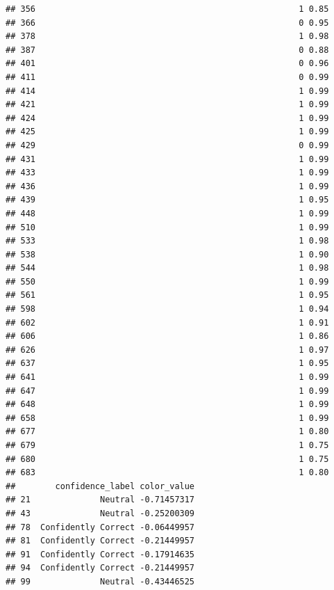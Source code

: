 \documentclass[
]{article}
\begin{document}
\begin{verbatim}
## 356                                                     1 0.85
## 366                                                     0 0.95
## 378                                                     1 0.98
## 387                                                     0 0.88
## 401                                                     0 0.96
## 411                                                     0 0.99
## 414                                                     1 0.99
## 421                                                     1 0.99
## 424                                                     1 0.99
## 425                                                     1 0.99
## 429                                                     0 0.99
## 431                                                     1 0.99
## 433                                                     1 0.99
## 436                                                     1 0.99
## 439                                                     1 0.95
## 448                                                     1 0.99
## 510                                                     1 0.99
## 533                                                     1 0.98
## 538                                                     1 0.90
## 544                                                     1 0.98
## 550                                                     1 0.99
## 561                                                     1 0.95
## 598                                                     1 0.94
## 602                                                     1 0.91
## 606                                                     1 0.86
## 626                                                     1 0.97
## 637                                                     1 0.95
## 641                                                     1 0.99
## 647                                                     1 0.99
## 648                                                     1 0.99
## 658                                                     1 0.99
## 677                                                     1 0.80
## 679                                                     1 0.75
## 680                                                     1 0.75
## 683                                                     1 0.80
##        confidence_label color_value
## 21              Neutral -0.71457317
## 43              Neutral -0.25200309
## 78  Confidently Correct -0.06449957
## 81  Confidently Correct -0.21449957
## 91  Confidently Correct -0.17914635
## 94  Confidently Correct -0.21449957
## 99              Neutral -0.43446525

\end{verbatim}
\end{document}
